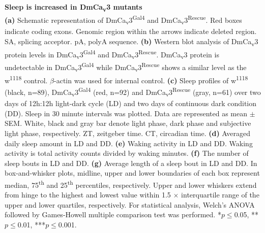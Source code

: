 \label{fig:3}
\textbf{Sleep is increased in DmCa\textsubscript{v}3 mutants}
\\
\textbf{(a)} Schematic representation of DmCa\textsubscript{v}3\textsuperscript{Gal4} and DmCa\textsubscript{v}3\textsuperscript{Rescue}. 
Red boxes indicate coding exons.
Genomic region within the arrows indicate deleted region.
SA, splicing acceptor. pA, polyA sequence.  
\textbf{(b)} Western blot analysis of DmCa\textsubscript{v}3 protein levels in DmCa\textsubscript{v}3\textsuperscript{Gal4} and DmCa\textsubscript{v}3\textsuperscript{Rescue}.
DmCa\textsubscript{v}3 protein is undetectable in DmCa\textsubscript{v}3\textsuperscript{Gal4} while DmCa\textsubscript{v}3\textsuperscript{Rescue} shows a similar level as the w\textsuperscript{1118} control.
$\beta$-actin was used for internal control.
\textbf{(c)} Sleep profiles of w\textsuperscript{1118} (black, n=89), DmCa\textsubscript{v}3\textsuperscript{Gal4} (red, n=92) and DmCa\textsubscript{v}3\textsuperscript{Rescue} (gray, n=61) over two days of 12h:12h light-dark cycle (LD) and two days of continuous dark condition (DD).
Sleep in 30 minute intervals was plotted.
Data are represented as mean $\pm$ SEM.
White, black and gray bar denote light phase, dark phase and subjective light phase, respectively.
ZT, zeitgeber time.
CT, circadian time.
\textbf{(d)} Averaged daily sleep amount in LD and DD.
\textbf{(e)} Waking activity in LD and DD.
Waking activity is total activity counts divided by waking minutes.
\textbf{(f)} The number of sleep bouts in LD and DD.
\textbf{(g)} Average length of a sleep bout in LD and DD.
In box-and-whisker plots, midline, upper and lower boundaries of each box represent median, 75\textsuperscript{th} and 25\textsuperscript{th} percentiles, respectively.
Upper and lower whiskers extend from hinge to the highest and lowest value within 1.5 $\times$ interquartile range of the upper and lower quartiles, respectively.
For statistical analysis, Welch's ANOVA followed by Games-Howell multiple comparison test was performed.
*$p\le$0.05, **$p\le$0.01, ***$p\le$0.001.
  
  
  
  
  